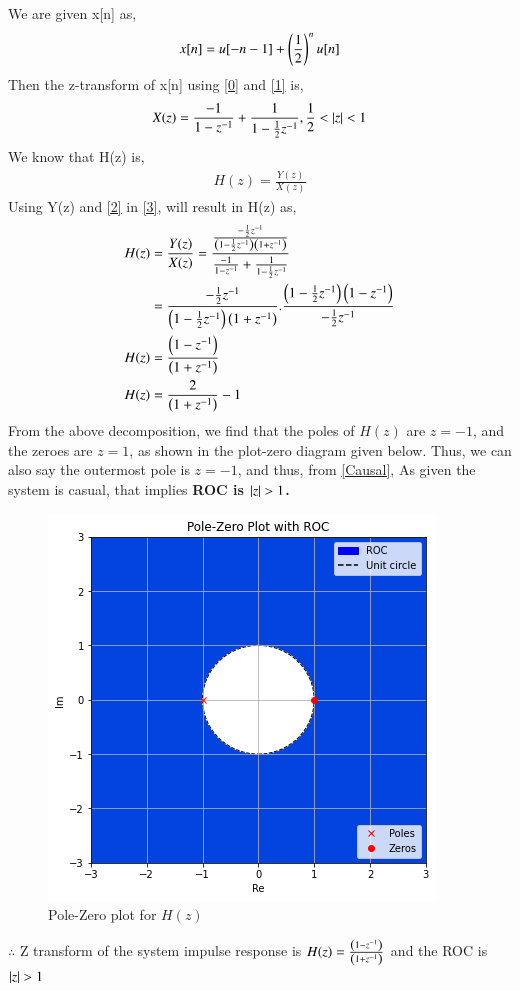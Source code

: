 \documentclass[journal,12pt,twocolumn]{IEEEtran}
\begin{document}
We are given x[n] as,
\begin{align}
    x[n]=u[-n-1]+\left(\frac{1}{2}\right)^n u[n]
\end{align}
Then the z-transform of x[n] using \eqref{0} and \eqref{1} is,
\begin{align}
    X(z)=\frac{-1}{1-z^{-1}}+\frac{1}{1-\frac{1}{2}z^{-1}},\frac{1}{2}<\vert z\vert<1\label{2}
\end{align}
We know that H(z) is,
\begin{align}
    H(z)=\frac{Y(z)}{X(z)}\label{3}
\end{align}
Using Y(z) and \eqref{2} in \eqref{3}, will result in H(z) as,
\begin{align}
    H(z)&=\frac{Y(z)}{X(z)}=\frac{\frac{-\frac{1}{2}z^{-1}}{\left(1-\frac{1}{2}z^{-1}\right)\left(1+z^{-1}\right)}}{\frac{-1}{1-z^{-1}}+\frac{1}{1-\frac{1}{2}z^{-1}}}\\
  \nonumber  &=\frac{-\frac{1}{2}z^{-1}}{\left(1-\frac{1}{2}z^{-1}\right)\left(1+z^{-1}\right)}.\frac{\left(1-\frac{1}{2}z^{-1}\right)\left(1-z^{-1}\right)}{-\frac{1}{2}z^{-1}}\\
  \nonumber H(z)&= \frac{\left(1-z^{-1}\right)}{\left(1+z^{-1}\right)}\\
  H(z)&=\frac{{2}}{\left(1+z^{-1}\right)}-1
\end{align}
From the above decomposition, we find that the poles of $H(z)$ are $z = -1$, and the zeroes are $z = 1$, as shown in the plot-zero diagram given below.
Thus, we can also say the outermost pole is $z = -1$, and thus, from \eqref{Causal}, As given the system is casual, that implies \textbf{ROC is $\vert z\vert > 1$.}

\begin{figure}[!htp]
    \centering
    \includegraphics[width=\columnwidth]{1.png}
    \caption{Pole-Zero plot for $H(z)$ }
    \label{f0}
\end{figure}

$\therefore$ Z transform of the system impulse response is $H(z)=\frac{\left(1-z^{-1}\right)}{\left(1+z^{-1}\right)}$ and the ROC is $\vert z\vert > 1$
\end{document}
